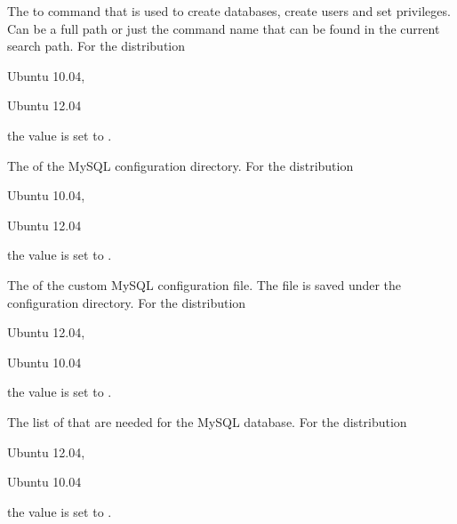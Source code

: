
The  to  command that is used to create databases,
create users and set privileges. Can be a full path or
just the command name that can be found in the current search path. 
For the distribution
\begin{inparaitem}
\item[\TheDistribution{ubuntu}] Ubuntu 10.04,
\item[\TheDistribution{ubuntu}] Ubuntu 12.04
\end{inparaitem}
the value is set to .


The  of the MySQL configuration directory.
For the distribution
\begin{inparaitem}
\item[\TheDistribution{ubuntu}] Ubuntu 10.04,
\item[\TheDistribution{ubuntu}] Ubuntu 12.04
\end{inparaitem}
the value is set to .


The  of the custom MySQL configuration file. The file is saved
under the configuration directory.
For the distribution
\begin{inparaitem}
\item[\TheDistribution{ubuntu}] Ubuntu 12.04,
\item[\TheDistribution{ubuntu}] Ubuntu 10.04
\end{inparaitem}
the value is set to .


The list of  that are needed for the MySQL database. 
For the distribution
\begin{inparaitem}
\item[\TheDistribution{ubuntu}] Ubuntu 12.04,
\item[\TheDistribution{ubuntu}] Ubuntu 10.04
\end{inparaitem}
the value is set to .

